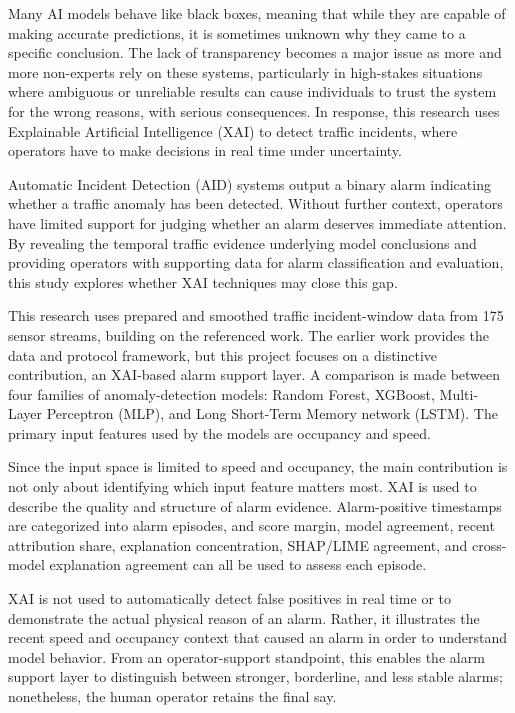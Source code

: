 \documentclass[10pt,a4paper]{article}
\begin{document}
	\begin{center}
		\begin{minipage}{0.78\textwidth}
			
		Many AI models behave like black boxes, meaning that while they are capable of making accurate predictions, it is sometimes unknown why they came to a specific conclusion. The lack of transparency becomes a major issue as more and more non-experts rely on these systems, particularly in high-stakes situations where ambiguous or unreliable results can cause individuals to trust the system for the wrong reasons, with serious consequences. In response, this research uses Explainable Artificial Intelligence (XAI) to detect traffic incidents, where operators have to make decisions in real time under uncertainty.	
			
		\vspace{6pt}
		
		Automatic Incident Detection (AID) systems output a binary alarm indicating whether a traffic anomaly has been detected. Without further context, operators have limited support for judging whether an alarm deserves immediate attention. By revealing the temporal traffic evidence underlying model conclusions and providing operators with supporting data for alarm classification and evaluation, this study explores whether XAI techniques may close this gap.
		
		\vspace{6pt}
		This research uses prepared and smoothed traffic incident-window data from 175 sensor streams, building on the referenced work\cite{abujudom2025}. The earlier work provides the data and protocol framework, but this project focuses on a distinctive contribution, an XAI-based alarm support layer. A comparison is made between four families of anomaly-detection models: Random Forest, XGBoost, Multi-Layer Perceptron (MLP), and Long Short-Term Memory network (LSTM). The primary input features used by the models are occupancy and speed.
		
		\vspace{6pt}
		Since the input space is limited to speed and occupancy, the main contribution is not only about identifying which input feature matters most.  XAI is used to describe the quality and structure of alarm evidence. Alarm-positive timestamps are categorized into alarm episodes, and score margin, model agreement, recent attribution share, explanation concentration, SHAP/LIME agreement, and cross-model explanation agreement can all be used to assess each episode.
		
		\vspace{6pt}
		XAI is not used to automatically detect false positives in real time or to demonstrate the actual physical reason of an alarm. Rather, it illustrates the recent speed and occupancy context that caused an alarm in order to understand model behavior. From an operator-support standpoint, this enables the alarm support layer to distinguish between stronger, borderline, and less stable alarms; nonetheless, the human operator retains the final say.
		
			
			
		\end{minipage}
	\end{center}
	
\end{document}
